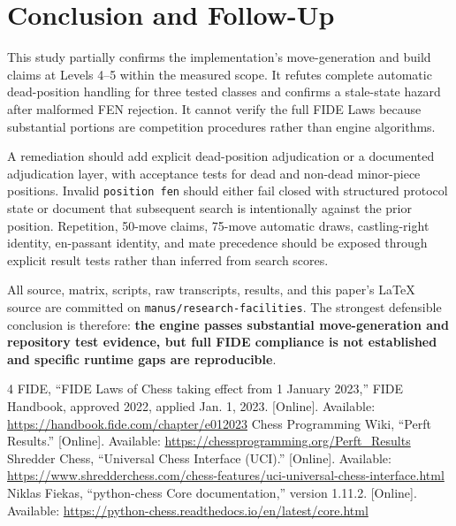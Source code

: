 \documentclass[conference]{IEEEtran}
\begin{document}
\section{Conclusion and Follow-Up}
This study partially confirms the implementation's move-generation and build claims at Levels 4--5 within the measured scope. It refutes complete automatic dead-position handling for three tested classes and confirms a stale-state hazard after malformed FEN rejection. It cannot verify the full FIDE Laws because substantial portions are competition procedures rather than engine algorithms.

A remediation should add explicit dead-position adjudication or a documented adjudication layer, with acceptance tests for dead and non-dead minor-piece positions. Invalid \texttt{position fen} should either fail closed with structured protocol state or document that subsequent search is intentionally against the prior position. Repetition, 50-move claims, 75-move automatic draws, castling-right identity, en-passant identity, and mate precedence should be exposed through explicit result tests rather than inferred from search scores.

All source, matrix, scripts, raw transcripts, results, and this paper's LaTeX source are committed on \texttt{manus/research-facilities}. The strongest defensible conclusion is therefore: \textbf{the engine passes substantial move-generation and repository test evidence, but full FIDE compliance is not established and specific runtime gaps are reproducible}.

\begin{thebibliography}{4}
 FIDE, ``FIDE Laws of Chess taking effect from 1 January 2023,'' FIDE Handbook, approved 2022, applied Jan. 1, 2023. [Online]. Available: \url{https://handbook.fide.com/chapter/e012023}
 Chess Programming Wiki, ``Perft Results.'' [Online]. Available: \url{https://chessprogramming.org/Perft_Results}
 Shredder Chess, ``Universal Chess Interface (UCI).'' [Online]. Available: \url{https://www.shredderchess.com/chess-features/uci-universal-chess-interface.html}
 Niklas Fiekas, ``python-chess Core documentation,'' version 1.11.2. [Online]. Available: \url{https://python-chess.readthedocs.io/en/latest/core.html}
\end{thebibliography}
\end{document}
